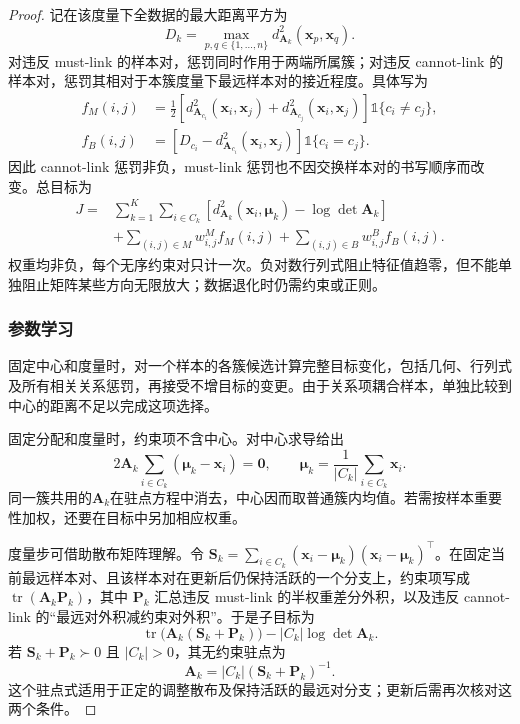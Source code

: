 \begin{proof}
记在该度量下全数据的最大距离平方为
\[
 D_k=\max_{p,q\in\{1,\ldots,n\}}
 d_{\bm{A}_k}^2(\bm{x}_p,\bm{x}_q).
\]
对违反 must-link 的样本对，惩罚同时作用于两端所属簇；对违反 cannot-link 的样本对，惩罚其相对于本簇度量下最远样本对的接近程度。具体写为
\begin{align}
 f_M(i,j)
 &=\frac12\left[
 d_{\bm{A}_{c_i}}^2(\bm{x}_i,\bm{x}_j)
 +d_{\bm{A}_{c_j}}^2(\bm{x}_i,\bm{x}_j)\right]
 \mathbb{1}\{c_i\ne c_j\},\nonumber\\
 f_B(i,j)
 &=\left[D_{c_i}
 -d_{\bm{A}_{c_i}}^2(\bm{x}_i,\bm{x}_j)\right]
 \mathbb{1}\{c_i=c_j\}.
 \label{eq:clustering-mpck-penalty}
\end{align}
因此 cannot-link 惩罚非负，must-link 惩罚也不因交换样本对的书写顺序而改变。总目标为
\begin{equation}
 \begin{aligned}
 J={}&\sum_{k=1}^K\sum_{i\in C_k}
 \left[d_{\bm{A}_k}^2(\bm{x}_i,\bm{\mu}_k)
       -\log\det\bm{A}_k\right]\\
 &+\sum_{(i,j)\in M}w_{i,j}^{M}f_M(i,j)
  +\sum_{(i,j)\in B}w_{i,j}^{B}f_B(i,j).
 \end{aligned}
 \label{eq:clustering-mpck}
\end{equation}
权重均非负，每个无序约束对只计一次。负对数行列式阻止特征值趋零，但不能单独阻止矩阵某些方向无限放大；数据退化时仍需约束或正则。

\subsubsection{参数学习}

固定中心和度量时，对一个样本的各簇候选计算完整目标变化，包括几何、行列式及所有相关关系惩罚，再接受不增目标的变更。由于关系项耦合样本，单独比较到中心的距离不足以完成这项选择。

固定分配和度量时，约束项不含中心。对中心求导给出
\[
 2\bm{A}_k\sum_{i\in C_k}(\bm{\mu}_k-\bm{x}_i)=\bm{0},
 \qquad
 \bm{\mu}_k=\frac{1}{|C_k|}\sum_{i\in C_k}\bm{x}_i.
\]
同一簇共用的$\bm{A}_k$在驻点方程中消去，中心因而取普通簇内均值。若需按样本重要性加权，还要在目标中另加相应权重。

度量步可借助散布矩阵理解。令 $\bm{S}_k=\sum_{i\in C_k}(\bm{x}_i-\bm{\mu}_k)(\bm{x}_i-\bm{\mu}_k)^\top$。在固定当前最远样本对、且该样本对在更新后仍保持活跃的一个分支上，约束项写成 $\operatorname{tr}(\bm{A}_k\bm{P}_k)$，其中 $\bm{P}_k$ 汇总违反 must-link 的半权重差分外积，以及违反 cannot-link 的“最远对外积减约束对外积”。于是子目标为
\[
 \operatorname{tr}\bigl(\bm{A}_k(\bm{S}_k+\bm{P}_k)\bigr)
 -|C_k|\log\det\bm{A}_k.
\]
若 $\bm{S}_k+\bm{P}_k\succ0$ 且 $|C_k|>0$，其无约束驻点为
\begin{equation}
 \bm{A}_k=|C_k|(\bm{S}_k+\bm{P}_k)^{-1}.
 \label{eq:clustering-mpck-metric}
\end{equation}
这个驻点式适用于正定的调整散布及保持活跃的最远对分支；更新后需再次核对这两个条件。


\end{proof}
